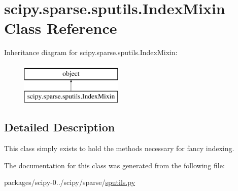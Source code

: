 \hypertarget{classscipy_1_1sparse_1_1sputils_1_1IndexMixin}{}\section{scipy.\+sparse.\+sputils.\+Index\+Mixin Class Reference}
\label{classscipy_1_1sparse_1_1sputils_1_1IndexMixin}
Inheritance diagram for scipy.\+sparse.\+sputils.\+Index\+Mixin\+:\begin{figure}[H]
\begin{center}
\leavevmode
\includegraphics[height=2.000000cm]{classscipy_1_1sparse_1_1sputils_1_1IndexMixin}
\end{center}
\end{figure}


\subsection{Detailed Description}
\begin{DoxyVerb}This class simply exists to hold the methods necessary for fancy indexing.
\end{DoxyVerb}
 

The documentation for this class was generated from the following file\+:\begin{DoxyCompactItemize}
\item 
packages/scipy-\/0../scipy/sparse/\hyperlink{sputils_8py}{sputils.\+py}\end{DoxyCompactItemize}
